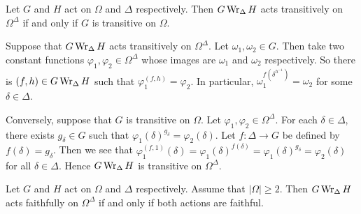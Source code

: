 \begin{proposition} \label{prop-product-action-transitive}
Let $G$ and $H$ act on $\Omega$ and $\Delta$ respectively.  Then $G\operatorname{Wr}_\Delta H$ acts transitively on $\Omega^\Delta$ if and only if $G$ is transitive on $\Omega$.
\end{proposition}
\begin{sketch}
	Suppose that $G\operatorname{Wr}_\Delta H$ acts transitively on $\Omega^\Delta$. Let $\omega_1,\omega_2\in G$. Then take two constant functions $\varphi_1,\varphi_2\in \Omega^\Delta$ whose images are $\omega_1$ and $\omega_2$ respectively. So there is $(f,h)\in G\operatorname{Wr}_{\Delta} H$ such that $\varphi_1^{(f,h)} = \varphi_2$. In particular, $\omega_1^{f(\delta^{h^{-1}})} = \omega_2$ for some $\delta\in\Delta$.
	
	Conversely, suppose that $G$ is transitive on $\Omega$. Let $\varphi_1,\varphi_2\in \Omega^\Delta$. For each $\delta\in\Delta$, there exists $g_\delta\in G$ such that $\varphi_1(\delta)^{g_\delta} = \varphi_2(\delta)$. Let $f:\Delta\to G$ be defined by $f(\delta) = g_\delta$. Then we see that $\varphi_1^{(f,1)}(\delta) = \varphi_1(\delta)^{f(\delta)} = \varphi_1(\delta)^{g_\delta} = \varphi_2(\delta)$ for all $\delta\in\Delta$. Hence $G\operatorname{Wr}_\Delta H$ is transitive on $\Omega^\Delta$.
\end{sketch}
\begin{proposition}
	Let $G$ and $H$ act on $\Omega$ and $\Delta$ respectively. Assume that $|\Omega|\geq 2$. Then $G\operatorname{Wr}_\Delta H$ acts faithfully on $\Omega^\Delta$ if and only if both actions are faithful. 
\end{proposition}
